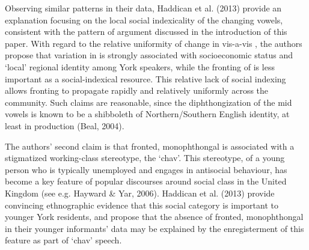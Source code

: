 \documentclass[PWPL]{article}
\begin{document}
Observing similar patterns in their data, Haddican et al. (2013) provide an explanation focusing on the local social indexicality of the changing vowels, consistent with the pattern of argument discussed in the introduction of this paper.  With regard to the relative uniformity of change in  vis-a-vis , the authors propose that variation in  is strongly associated with socioeconomic status and `local' regional identity among York speakers, while the fronting of  is less important as a social-indexical resource. This relative lack of social indexing allows  fronting to propagate rapidly and relatively uniformly across the community. Such claims are reasonable, since the diphthongization of the mid vowels is known to be a shibboleth of Northern/Southern English identity, at least in production (Beal, 2004). 

The authors' second claim is that fronted, monophthongal  is associated with a stigmatized working-class stereotype, the `chav'. This stereotype, of a young person who is typically unemployed and engages in antisocial behaviour, has become a key feature of popular discourses around social class in the United Kingdom (see e.g. Hayward \& Yar, 2006). Haddican et al. (2013) provide convincing ethnographic evidence that this social category is important to younger York residents, and propose that the absence of fronted, monophthongal  in their younger informants' data may be explained by the enregisterment of this feature as part of `chav' speech.
\end{document}
